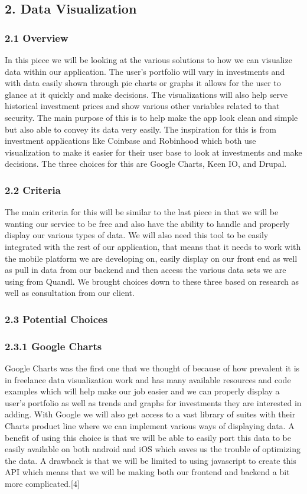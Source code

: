 \documentclass[onecolumn, draftclsnofoot,10pt, compsoc]{IEEEtran}
\begin{document}
\subsection{2. Data Visualization}

\subsubsection{2.1 Overview}
In this piece we will be looking at the various solutions to how we can visualize data within our application. The user’s portfolio will vary in investments and with data easily shown through pie charts or graphs it allows for the user to glance at it quickly and make decisions. The visualizations will also help serve historical investment prices and show various other variables related to that security. The main purpose of this is to help make the app look clean and simple but also able to convey its data very easily. The inspiration for this is from investment applications like Coinbase and Robinhood which both use visualization to make it easier for their user base to look at investments and make decisions. The three choices for this are Google Charts, Keen IO, and Drupal. 

\subsubsection{2.2 Criteria}
The main criteria for this will be similar to the last piece in that we will be wanting our service to be free and also have the ability to handle and properly display our various types of data. We will also need this tool to be easily integrated with the rest of our application, that means that it needs to work with the mobile platform we are developing on, easily display on our front end as well as pull in data from our backend and then access the various data sets we are using from Quandl.  We brought choices down to these three based on research as well as consultation from our client. 

\subsubsection{2.3 Potential Choices}

\subsubsection{2.3.1 Google Charts}
Google Charts was the first one that we thought of because of how prevalent it is in freelance data visualization work and has many available resources and code examples which will help make our job easier and we can properly display a user’s portfolio as well as trends and graphs for investments they are interested in adding. With Google we will also get access to a vast library of suites with their Charts product line where we can implement various ways of displaying data. A benefit of using this choice is that we will be able to easily port this data to be easily available on both android and iOS which saves us the trouble of optimizing the data. A drawback is that we will be limited to using javascript to create this API which means that we will be making both our frontend and backend a bit more complicated.[4]
\end{document}
